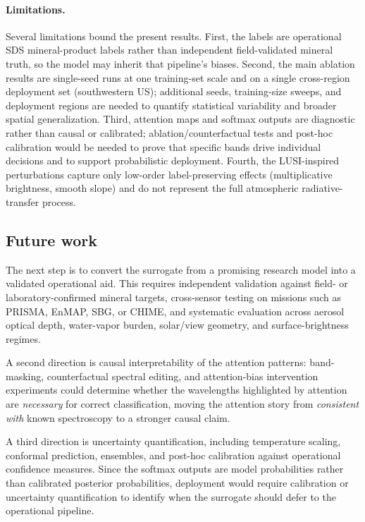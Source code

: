 \documentclass[preprint,12pt]{elsarticle}
\begin{document}
\paragraph{Limitations.}
Several limitations bound the present results.
First, the labels are operational SDS mineral-product labels rather than independent field-validated mineral truth, so the model may inherit that pipeline's biases.
Second, the main ablation results are single-seed runs at one training-set scale and on a single cross-region deployment set (southwestern US); additional seeds, training-size sweeps, and deployment regions are needed to quantify statistical variability and broader spatial generalization.
Third, attention maps and softmax outputs are diagnostic rather than causal or calibrated; ablation/counterfactual tests and post-hoc calibration would be needed to prove that specific bands drive individual decisions and to support probabilistic deployment.
Fourth, the LUSI-inspired perturbations capture only low-order label-preserving effects (multiplicative brightness, smooth slope) and do not represent the full atmospheric radiative-transfer process.

\subsection{Future work}
\label{sec:future_work}

The next step is to convert the surrogate from a promising research model into a validated operational aid.
This requires independent validation against field- or laboratory-confirmed mineral targets, cross-sensor testing on missions such as PRISMA, EnMAP, SBG, or CHIME, and systematic evaluation across aerosol optical depth, water-vapor burden, solar/view geometry, and surface-brightness regimes.

A second direction is causal interpretability of the attention patterns: band-masking, counterfactual spectral editing, and attention-bias intervention experiments could determine whether the wavelengths highlighted by attention are \emph{necessary} for correct classification, moving the attention story from \emph{consistent with} known spectroscopy to a stronger causal claim.

A third direction is uncertainty quantification, including temperature scaling, conformal prediction, ensembles, and post-hoc calibration against operational confidence measures.
Since the softmax outputs are model probabilities rather than calibrated posterior probabilities, deployment would require calibration or uncertainty quantification to identify when the surrogate should defer to the operational pipeline.
\end{document}
